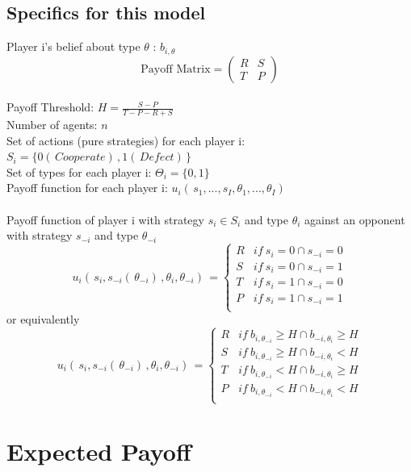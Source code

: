 \documentclass[]{llncs}
\begin{document}
\subsection{Specifics for this model}
Player i's belief about type $\theta$ :  $b_{i,\theta}$ \\ 
\[
   \text{Payoff Matrix} = \begin{pmatrix} 
   R & S  \\
   T & P  
   \end{pmatrix} 
\]
\\
Payoff Threshold: $H = \frac{S-P}{T-P-R+S}$ \\
Number of agents: $n$ \\ 
Set of actions (pure strategies) for each player i: $S_i = \{0 (\,Cooperate)\, ,1 (\,Defect)\,\}$\\
Set of types for each player i: $ \Theta_i = \{0,1\}$ \\
Payoff function for each player i: $u_i(\,s_1, . . . ,s_I, \theta_1, . . . , \theta_I)\,$\\
\\
Payoff function of player i with strategy $s_i \in S_i$ and type $\theta_i$ against an opponent with strategy $s_{-i}$ and type $\theta_{-i}$
\[
   u_i(\,s_i, s_{-i}(\,\theta_{-i})\,,  \theta_i, \theta_{-i})\, =  \begin{cases}
        R & if\ s_i = 0 \cap s_{-i} = 0 \\
        S & if\ s_i = 0 \cap s_{-i} = 1 \\
        T & if\ s_i = 1 \cap s_{-i} = 0 \\
        P & if\ s_i = 1 \cap s_{-i} = 1 \\
    \end{cases}
\]
or equivalently 
\[
   u_i(\,s_i, s_{-i}(\,\theta_{-i})\,,  \theta_i, \theta_{-i})\, =  \begin{cases}
        R & if\ b_{i,\theta_{-i}} \geq H \cap b_{-i,\theta_{i}}  \geq H \\
        S & if\ b_{i,\theta_{-i}}  \geq H \cap b_{-i,\theta_{i}} < H \\
        T & if\ b_{i,\theta_{-i}}  < H \cap b_{-i,\theta_{i}} \geq H \\
        P & if\ b_{i,\theta_{-i}} < H \cap b_{-i,\theta_{i}} < H \\
    \end{cases}
\]


\section{Expected Payoff}
\end{document}
